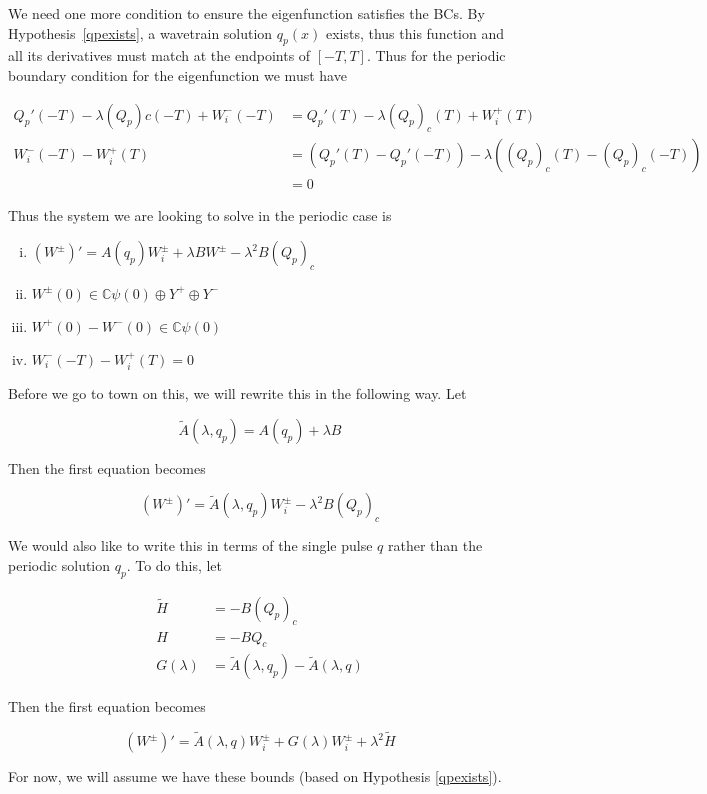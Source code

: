 \documentclass[12pt]{article}
\def\C{{\mathbb C}}
\begin{document}
We need one more condition to ensure the eigenfunction satisfies the BCs. By Hypothesis~\ref{qpexists}, a wavetrain solution $q_p(x)$ exists, thus this function and all its derivatives must match at the endpoints of $[-T, T]$.  Thus for the periodic boundary condition for the eigenfunction we must have

\begin{align*}
Q_p'(-T) - \lambda (Q_p)c(-T) + W_i^-(-T) &= Q_p'(T) - \lambda (Q_p)_c(T) + W_i^+(T) \\
W_i^-(-T) - W_i^+(T) &= ( Q_p'(T) - Q_p'(-T) ) - \lambda( (Q_p)_c(T) - (Q_p)_c(-T) ) \\
&= 0
\end{align*}

Thus the system we are looking to solve in the periodic case is

\begin{enumerate}[(i)]
\item $(W^\pm)' = A(q_p) W_i^\pm + \lambda B W^\pm - \lambda^2 B (Q_p)_c$
\item $W^\pm(0) \in \C \psi(0) \oplus Y^+ \oplus Y^-$
\item $W^+(0) - W^-(0) \in \C \psi(0) $
\item $W_i^-(-T) - W_i^+(T) = 0 $
\end{enumerate}

Before we go to town on this, we will rewrite this in the following way. Let

\[
\tilde{A}(\lambda, q_p) = A(q_p) + \lambda B
\]

Then the first equation becomes 

\[
(W^\pm)' = \tilde{A}(\lambda, q_p) W_i^\pm - \lambda^2 B (Q_p)_c
\]

We would also like to write this in terms of the single pulse $q$ rather than the periodic solution $q_p$. To do this, let

\begin{align*}
\tilde{H} &= -B(Q_p)_c \\
H &= -B Q_c \\
G(\lambda) &= \tilde{A}(\lambda, q_p) - \tilde{A}(\lambda, q)
\end{align*}

Then the first equation becomes 

\[
(W^\pm)' = \tilde{A}(\lambda, q) W_i^\pm + G(\lambda) W_i^\pm + \lambda^2 \tilde{H}
\]

For now, we will assume we have these bounds (based on Hypothesis \ref{qpexists}).
\end{document}
